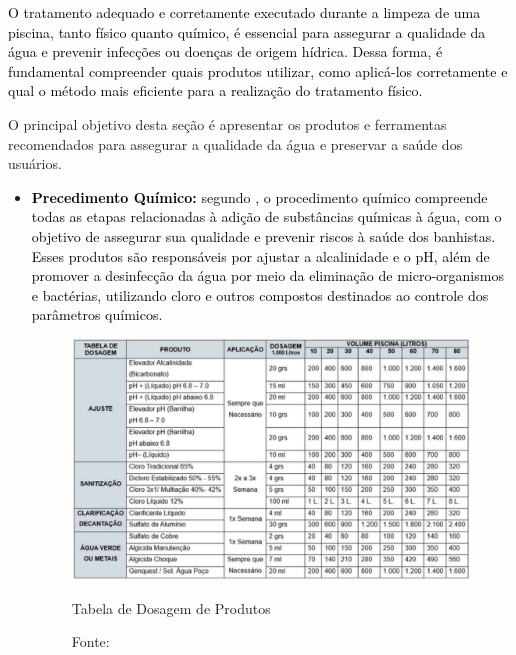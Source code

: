         \textcolor{black}{O tratamento adequado e corretamente executado durante a limpeza de uma piscina, tanto físico quanto químico, é essencial para assegurar a qualidade da água e prevenir infecções ou doenças de origem hídrica. Dessa forma, é fundamental compreender quais produtos utilizar, como aplicá-los corretamente e qual o método mais eficiente para a realização do tratamento físico.}

        O principal objetivo desta seção é apresentar os produtos e ferramentas recomendados para assegurar a qualidade da água e preservar a saúde dos usuários.

        \begin{itemize}
        
            \item \textbf{\textcolor{black}{Precedimento Químico:}} \textcolor{black}{segundo \cite{guiaTratamento}, o procedimento químico compreende todas as etapas relacionadas à adição de substâncias químicas à água, com o objetivo de assegurar sua qualidade e prevenir riscos à saúde dos banhistas. Esses produtos são responsáveis por ajustar a alcalinidade e o pH, além de promover a desinfecção da água por meio da eliminação de micro-organismos e bactérias, utilizando cloro e outros compostos destinados ao controle dos parâmetros químicos.}

                \begin{figure}[H]
                    \centering
                    \caption{ }  
                	\centering
                    \label{fig:cont}
                	\includegraphics[width=1.00\textwidth]{imagens/tabelaProdutos.png}
                    \caption*{Tabela de Dosagem de Produtos}
                	\caption*{Fonte: \cite{guiaTratamento}}
                \end{figure}
    

\end{itemize}
